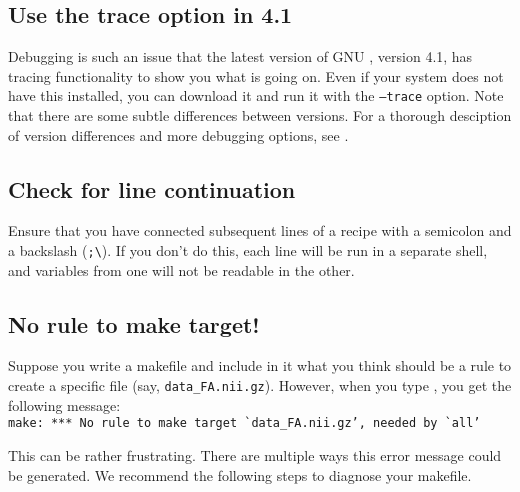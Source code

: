 \subsection{Use the trace option in \maken{} 4.1}
Debugging is such an issue that the latest version of GNU \maken{}, version 4.1, has tracing functionality to show you what is going on. Even if your system does not have this installed, you can download it and run it with the \texttt{--trace} option. Note that there are some subtle differences between \maken{} versions. For a thorough desciption of version differences and more debugging options, see . %

\subsection{Check for line continuation}

Ensure that you have connected subsequent lines of a recipe with a semicolon and a backslash (\texttt{;\textbackslash}). If you don't do this, each line will be run in a separate shell, and variables from one will not be readable in the other.

\subsection{No rule to make target!}

Suppose you write a makefile and include in it what you think should be a rule to create a specific file (say, \texttt{data_FA.nii.gz}). However, when you type \maken, you get the following message: \\
\texttt{make: *** No rule to make target \`{}data_FA.nii.gz', needed by \`{}all'}

This can be rather frustrating. There are multiple ways this error message could be generated. We recommend the following steps to diagnose your makefile.


